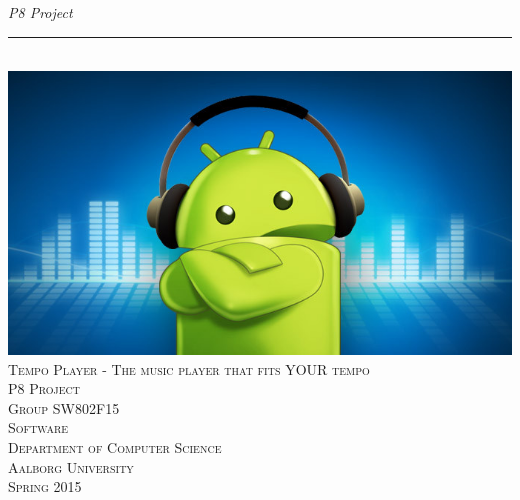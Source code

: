 \thispagestyle{empty}
\begin{flushright}
\vspace{3cm}

\phantom{hul}

\phantom{hul}

\phantom{hul}

\textsl{P8 Project} \\ \vspace{1cm}

\rule{1\textwidth}{3mm} \\ \vspace{1.5cm}
\includegraphics[width=\textwidth]{Images/frontpage.jpg}
\vspace{1.5cm} \\
\textsc{\Large Tempo Player - The music player that fits YOUR tempo \\ 
P8 Project\\
Group SW802F15\\
Software\\
Department of Computer Science\\
Aalborg University\\
Spring 2015\\
~\\
}

\end{flushright}
